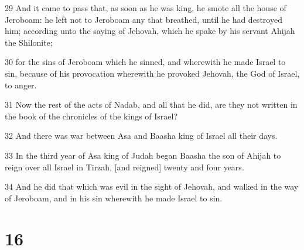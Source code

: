 \par 29 And it came to pass that, as soon as he was king, he smote all the house of Jeroboam: he left not to Jeroboam any that breathed, until he had destroyed him; according unto the saying of Jehovah, which he spake by his servant Ahijah the Shilonite;
\par 30 for the sins of Jeroboam which he sinned, and wherewith he made Israel to sin, because of his provocation wherewith he provoked Jehovah, the God of Israel, to anger.
\par 31 Now the rest of the acts of Nadab, and all that he did, are they not written in the book of the chronicles of the kings of Israel?
\par 32 And there was war between Asa and Baasha king of Israel all their days.
\par 33 In the third year of Asa king of Judah began Baasha the son of Ahijah to reign over all Israel in Tirzah, [and reigned] twenty and four years.
\par 34 And he did that which was evil in the sight of Jehovah, and walked in the way of Jeroboam, and in his sin wherewith he made Israel to sin.

\chapter{16}

